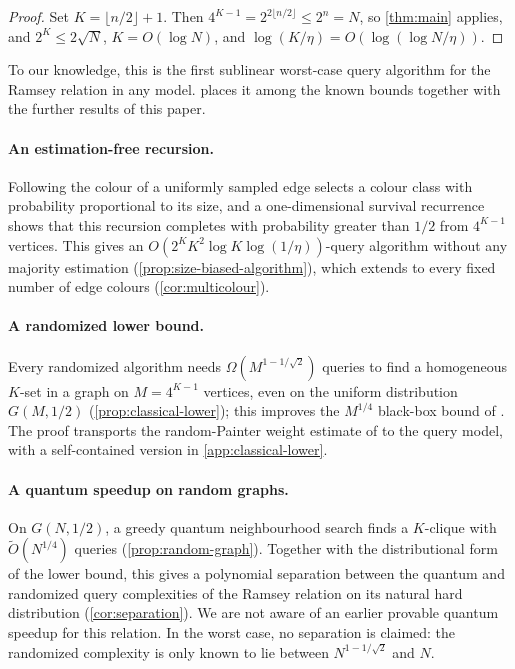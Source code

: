 \begin{proof}
Set $K=\lfloor n/2\rfloor+1$.  Then
$4^{K-1}=2^{2\lfloor n/2\rfloor}\le 2^n=N$, so \cref{thm:main} applies, and
$2^K\le2\sqrt N$, $K=O(\log N)$, and
$\log(K/\eta)=O(\log(\log N/\eta))$.
\end{proof}

To our knowledge, this is the first sublinear worst-case query algorithm
for the Ramsey relation in any model.   places it among
the known bounds together with the further results of this paper.

\paragraph{An estimation-free recursion.}
Following the colour of a uniformly sampled edge selects a colour class with
probability proportional to its size, and a one-dimensional survival
recurrence shows that this recursion completes with probability greater
than $1/2$ from $4^{K-1}$ vertices.  This gives an
$O(2^KK^2\log K\log(1/\eta))$-query algorithm without any majority
estimation (\cref{prop:size-biased-algorithm}), which extends to every
fixed number of edge colours (\cref{cor:multicolour}).

\paragraph{A randomized lower bound.}
Every randomized algorithm needs $\Omega(M^{1-1/\sqrt2})$ queries to find a
homogeneous $K$-set in a graph on $M=4^{K-1}$ vertices, even on the uniform
distribution $G(M,1/2)$ (\cref{prop:classical-lower}); this improves the
$M^{1/4}$ black-box bound of
\cite{ImpagliazzoNaor1988,KomargodskiNaorYogev2019}.  The proof transports
the random-Painter weight estimate of \cite{ConlonFoxGrinshpunHe2019} to
the query model, with a self-contained version in \cref{app:classical-lower}.

\paragraph{A quantum speedup on random graphs.}
On $G(N,1/2)$, a greedy quantum neighbourhood search finds a $K$-clique
with $\widetilde O(N^{1/4})$ queries (\cref{prop:random-graph}).  Together
with the distributional form of the lower bound, this gives a polynomial
separation between the quantum and randomized query complexities of the
Ramsey relation on its natural hard distribution (\cref{cor:separation}).
We are not aware of an earlier provable quantum speedup for this relation.
In the worst case, no separation is claimed: the randomized complexity is
only known to lie between $N^{1-1/\sqrt2}$ and $N$.

